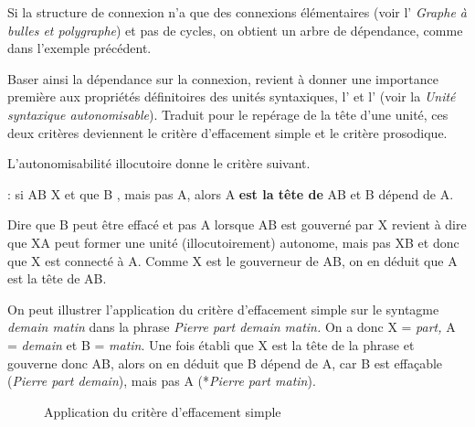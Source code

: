 Si la structure de connexion n’a que des connexions élémentaires (voir l’ \textit{Graphe à bulles et polygraphe}) et pas de cycles, on obtient un arbre de dépendance, comme dans l’exemple précédent.

Baser ainsi la dépendance sur la connexion, revient à donner une importance première aux propriétés définitoires des unités syntaxiques, l’ et l’ (voir la  \textit{Unité syntaxique autonomisable}). Traduit pour le repérage de la tête d’une unité, ces deux critères deviennent le critère d’effacement simple et le critère prosodique.

L’autonomisabilité illocutoire donne le critère suivant.

{ : si  AB  X et que B , mais pas A, alors A \textbf{est la tête de} AB et B dépend de A.}

Dire que B peut être effacé et pas A lorsque AB est gouverné par X revient à dire que XA peut former une unité (illocutoirement) autonome, mais pas XB et donc que X est connecté à A. Comme X est le gouverneur de AB, on en déduit que A est la tête de AB.

On peut illustrer l'application du critère d'effacement simple sur le syntagme \textit{demain matin} dans la phrase \textit{Pierre part demain matin.}
On a donc X = \textit{part,} A = \textit{demain} et B = \textit{matin}. Une fois établi que X est la tête de la phrase et gouverne donc AB, alors on en déduit que B dépend de A, car B est effaçable (\textit{Pierre part demain}), mais pas A (*\textit{Pierre part matin}).

\begin{figure}
\caption{\label{fig:}Application du critère d’effacement simple}
\end{figure}

